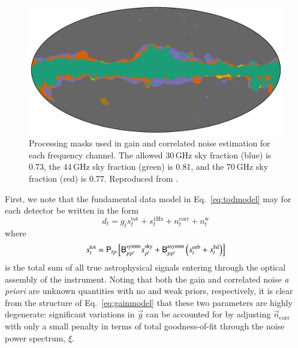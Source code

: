 \documentclass[twocolumn]{aa}
\newcommand{\n}[0]{\vec{n}}
\newcommand{\B}[0]{\tens{B}}
\newcommand{\g}[0]{\vec{g}}
\renewcommand{\P}[0]{\tens{P}}
\begin{document}
\begin{figure}[t]
  \center
  \includegraphics[width=\linewidth]{figs/mask_proc_BP8_v1.pdf}
  \caption{Processing masks used in gain and correlated noise
    estimation for each frequency channel. The allowed 30\,GHz sky
    fraction (blue) is 0.73, the 44\,GHz sky fraction (green) is 0.81,
    and the 70\,GHz sky fraction (red) is 0.77. Reproduced from
    \citet{bp07}.}
  \label{fig:procmask}
\end{figure}


First, we note that the fundamental data model in
Eq.~\eqref{eq:todmodel} may for each detector be written in the form
\begin{equation}
  d_{t} = g_{t} s^{\mathrm{tot}}_{t} + s^{\mathrm{1Hz}}_{t} + n^{\mathrm{corr}}_{t} + n^{\mathrm{w}}_{t} 
  \label{eq:gainmodel}
\end{equation}
where
\begin{equation}
  s^{\mathrm{tot}}_t = \P_{tp}\left[\B_{pp'}^{\mathrm{symm}}s^{\mathrm{sky}}_{p'} + \B_{pp'}^{\mathrm{asymm}}\left(s^{\mathrm{orb}}_{t}  
  + s^{\mathrm{fsl}}_{t}\right)\right]
  \label{eq:stot}
\end{equation}
is the total sum of all true astrophysical signals entering through
the optical assembly of the instrument. Noting that both the gain and
correlated noise \emph{a priori} are unknown quantities with no and
weak priors, respectively, it is clear from the structure of
Eq.~\eqref{eq:gainmodel} that these two parameters are highly
degenerate: significant variations in $\g$ can be accounted for by
adjusting $\n_{\mathrm{corr}}$ with only a small penalty in terms of
total goodness-of-fit through the noise power spectrum, $\xi$.
\end{document}
